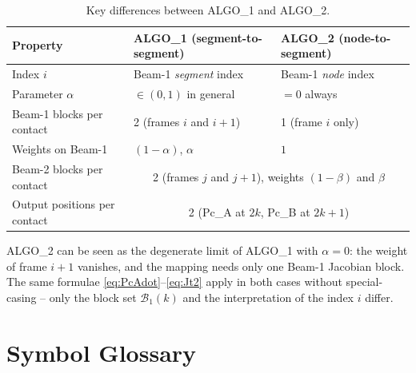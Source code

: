 \documentclass[11pt, a4paper]{article}
\begin{document}
\begin{table}[h]
\centering
\caption{Key differences between ALGO\_1 and ALGO\_2.}
\label{tab:algo_diff}
\begin{tabular}{lll}
\toprule
Property & ALGO\_1 (segment-to-segment) & ALGO\_2 (node-to-segment) \\
\midrule
Index $i$ & Beam-1 \emph{segment} index & Beam-1 \emph{node} index \\
Parameter $\alpha$ & $\in (0,1)$ in general & $= 0$ always \\
Beam-1 blocks per contact & 2 (frames $i$ and $i+1$) & 1 (frame $i$ only) \\
Weights on Beam-1 & $(1-\alpha)$, $\alpha$ & $1$ \\
Beam-2 blocks per contact & \multicolumn{2}{c}{2 (frames $j$ and $j+1$), weights $(1-\beta)$ and $\beta$} \\
Output positions per contact & \multicolumn{2}{c}{2 (Pc\_A at $2k$, Pc\_B at $2k+1$)} \\
\bottomrule
\end{tabular}
\end{table}

ALGO\_2 can be seen as the degenerate limit of ALGO\_1 with $\alpha = 0$:
the weight of frame $i+1$ vanishes, and the mapping needs only one Beam-1
Jacobian block. The same formulae \eqref{eq:PcAdot}--\eqref{eq:Jt2}
apply in both cases without special-casing -- only the block set
$\mathcal{B}_1(k)$ and the interpretation of the index $i$ differ.

\section{Symbol Glossary}
\end{document}
